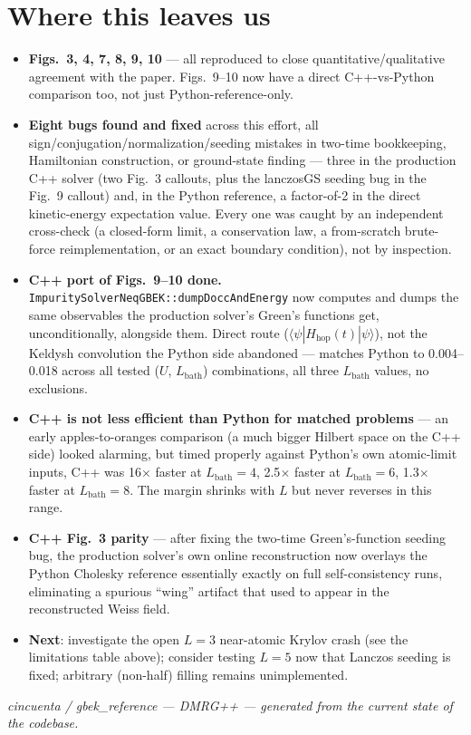 \documentclass[11pt]{article}
\begin{document}
\section*{Where this leaves us}

\begin{itemize}
  \item \textbf{Figs.\ 3, 4, 7, 8, 9, 10} --- all reproduced to close
    quantitative/qualitative agreement with the paper. Figs.\ 9--10 now
    have a direct C++-vs-Python comparison too, not just
    Python-reference-only.
  \item \textbf{Eight bugs found and fixed} across this effort, all
    sign/conjugation/normalization/seeding mistakes in two-time
    bookkeeping, Hamiltonian construction, or ground-state finding ---
    three in the production C++ solver (two Fig.\ 3 callouts, plus the
    lanczosGS seeding bug in the Fig.\ 9 callout) and, in the Python
    reference, a factor-of-2 in the direct kinetic-energy expectation
    value. Every one was caught by an independent cross-check (a
    closed-form limit, a conservation law, a from-scratch brute-force
    reimplementation, or an exact boundary condition), not by
    inspection.
  \item \textbf{C++ port of Figs.\ 9--10 done.}
    \texttt{ImpuritySolverNeqGBEK::dumpDoccAndEnergy} now computes and
    dumps the same observables the production solver's Green's functions
    get, unconditionally, alongside them. Direct route ($\langle\psi|
    H_\mathrm{hop}(t)|\psi\rangle$), not the Keldysh convolution the
    Python side abandoned --- matches Python to 0.004--0.018 across all
    tested ($U$, $L_\mathrm{bath}$) combinations, all three
    $L_\mathrm{bath}$ values, no exclusions.
  \item \textbf{C++ is not less efficient than Python for matched
    problems} --- an early apples-to-oranges comparison (a much bigger
    Hilbert space on the C++ side) looked alarming, but timed properly
    against Python's own atomic-limit inputs, C++ was 16$\times$ faster
    at $L_\mathrm{bath}=4$, 2.5$\times$ faster at $L_\mathrm{bath}=6$,
    1.3$\times$ faster at $L_\mathrm{bath}=8$. The margin shrinks with
    $L$ but never reverses in this range.
  \item \textbf{C++ Fig.\ 3 parity} --- after fixing the two-time
    Green's-function seeding bug, the production solver's own online
    reconstruction now overlays the Python Cholesky reference essentially
    exactly on full self-consistency runs, eliminating a spurious
    ``wing'' artifact that used to appear in the reconstructed Weiss
    field.
  \item \textbf{Next}: investigate the open $L=3$ near-atomic Krylov
    crash (see the limitations table above); consider testing $L=5$ now
    that Lanczos seeding is fixed; arbitrary (non-half) filling remains
    unimplemented.
\end{itemize}

\vfill
{\small\it cincuenta / gbek\_reference --- DMRG++ --- generated from the
current state of the codebase.}
\end{document}
